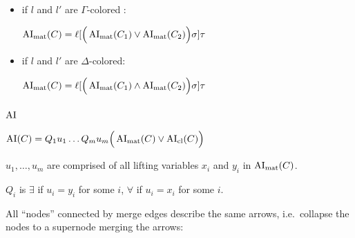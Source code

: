 \documentclass[,%
	paper=a4,%
	DIV14, %
	twoside=false,%
	liststotoc,
	bibtotoc,
	draft=false,%
	numbers=noendperiod
]{scrartcl}
\begin{document}
\begin{enumerate}
\begin{itemize}







			\item if $l$ and $l'$ are $\Gamma$-colored :

				$\operatorname{AI}_\mathrm{mat}(C) = \ell[\Big(\operatorname{AI}_\mathrm{mat}(C_1) \lor \operatorname{AI}_\mathrm{mat}(C_2)\Big)\sigma] \tau$
			\item if $l$ and $l'$ are $\Delta$-colored:

				$\operatorname{AI}_\mathrm{mat}(C) = \ell[\Big(\operatorname{AI}_\mathrm{mat}(C_1) \land \operatorname{AI}_\mathrm{mat}(C_2)\Big)\sigma] \tau$


		\end{itemize}

\end{enumerate}

\subsubsection{$\operatorname{AI}$}


$\operatorname{AI}(C) = Q_1 u_1 \ldots Q_m u_m \Big( \operatorname{AI}_\mathrm{mat}(C) \lor \operatorname{AI}_\mathrm{cl}(C) \Big)$

$u_1, \ldots, u_m$ are comprised of all lifting variables $x_i$ and $y_i$ in $\operatorname{AI}_\mathrm{mat}(C)$. 

$Q_i$ is $\exists$ if $u_i = y_i$ for some $i$, $\forall$ if $u_i = x_i$ for some $i$.

All ``nodes'' connected by merge edges describe the same arrows, i.e.~collapse the nodes to a supernode merging the arrows:
\end{document}
